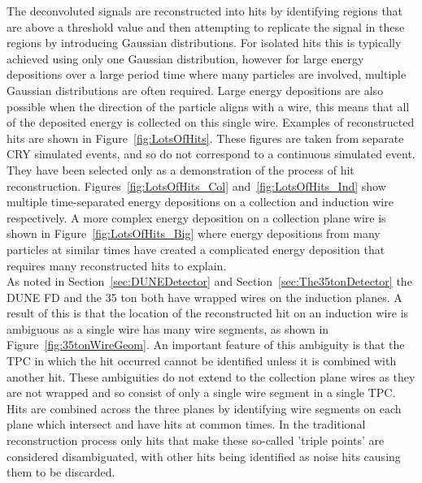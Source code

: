 The deconvoluted signals are reconstructed into hits by identifying regions that are above a threshold value and then attempting to replicate the signal in these regions by introducing Gaussian distributions. For isolated hits this is typically achieved using only one Gaussian distribution, however for large energy depositions over a large period time where many particles are involved, multiple Gaussian distributions are often required. Large energy depositions are also possible when the direction of the particle aligns with a wire, this means that all of the deposited energy is collected on this single wire. Examples of reconstructed hits are shown in Figure~\ref{fig:LotsOfHits}. These figures are taken from separate CRY simulated events, and so do not correspond to a continuous simulated event. They have been selected only as a demonstration of the process of hit reconstruction. Figures~\ref{fig:LotsOfHits_Col} and~\ref{fig:LotsOfHits_Ind} show multiple time-separated energy depositions on a collection and induction wire respectively. A more complex energy deposition on a collection plane wire is shown in Figure~\ref{fig:LotsOfHits_Big} where energy depositions from many particles at similar times have created a complicated energy deposition that requires many reconstructed hits to explain. \\

As noted in Section~\ref{sec:DUNEDetector} and Section~\ref{sec:The35tonDetector} the DUNE FD and the 35 ton both have wrapped wires on the induction planes. A result of this is that the location of the reconstructed hit on an induction wire is ambiguous as a single wire has many wire segments, as shown in Figure~\ref{fig:35tonWireGeom}. An important feature of this ambiguity is that the TPC in which the hit occurred cannot be identified unless it is combined with another hit. These ambiguities do not extend to the collection plane wires as they are not wrapped and so consist of only a single wire segment in a single TPC. Hits are combined across the three planes by identifying wire segments on each plane which intersect and have hits at common times. In the traditional reconstruction process only hits that make these so-called 'triple points' are considered disambiguated, with other hits being identified as noise hits causing them to be discarded. \\

